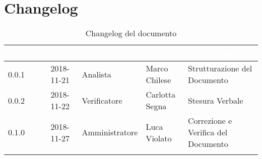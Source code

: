 \newpage

\section{Changelog}

\begin{center}
\begin{longtable}[c]{|m{}|m{}|m{}|m{}|p{}|}
\hline
\rowcolor{bluelogo}\textbf{\textcolor{white}{Versione}} & \textbf{\textcolor{white}{Data}} & \textbf{\textcolor{white}{Ruolo}} & \textbf{\textcolor{white}{Autore}} & \textbf{\textcolor{white}{Descrizione}}\\
\hline \hline
\endfirsthead
0.0.1 & 2018-11-21 & Analista & Marco Chilese & Strutturazione del Documento \\
\rowcolor{grigio} 0.0.2 & 2018-11-22 & Verificatore &Carlotta Segna  & Stesura Verbale \\
\hline
0.1.0 & 2018-11-27 & Amministratore &Luca Violato & Correzione e Verifica del Documento\\
\hline
\caption{Changelog del documento}
\end{longtable}
\end{center}
